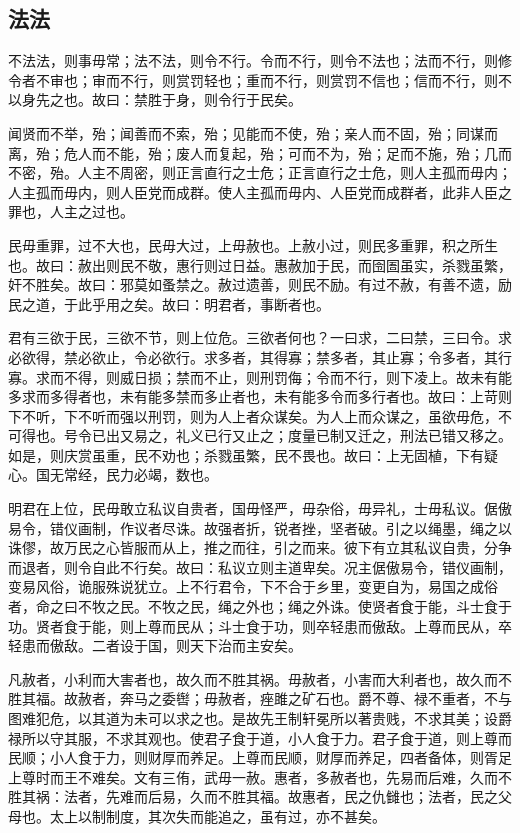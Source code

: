 \documentclass[]{article}
\begin{document}
\hypertarget{header-n282}{%
\subsection{法法}\label{header-n282}}

不法法，则事毋常；法不法，则令不行。令而不行，则令不法也；法而不行，则修令者不审也；审而不行，则赏罚轻也；重而不行，则赏罚不信也；信而不行，则不以身先之也。故曰：禁胜于身，则令行于民矣。

闻贤而不举，殆；闻善而不索，殆；见能而不使，殆；亲人而不固，殆；同谋而离，殆；危人而不能，殆；废人而复起，殆；可而不为，殆；足而不施，殆；几而不密，殆。人主不周密，则正言直行之士危；正言直行之士危，则人主孤而毋内；人主孤而毋内，则人臣党而成群。使人主孤而毋内、人臣党而成群者，此非人臣之罪也，人主之过也。

民毋重罪，过不大也，民毋大过，上毋赦也。上赦小过，则民多重罪，积之所生也。故曰：赦出则民不敬，惠行则过日益。惠赦加于民，而囹圄虽实，杀戮虽繁，奸不胜矣。故曰：邪莫如蚤禁之。赦过遗善，则民不励。有过不赦，有善不遗，励民之道，于此乎用之矣。故曰：明君者，事断者也。

君有三欲于民，三欲不节，则上位危。三欲者何也？一曰求，二曰禁，三曰令。求必欲得，禁必欲止，令必欲行。求多者，其得寡；禁多者，其止寡；令多者，其行寡。求而不得，则威日损；禁而不止，则刑罚侮；令而不行，则下凌上。故未有能多求而多得者也，未有能多禁而多止者也，未有能多令而多行者也。故曰：上苛则下不听，下不听而强以刑罚，则为人上者众谋矣。为人上而众谋之，虽欲毋危，不可得也。号令已出又易之，礼义已行又止之；度量已制又迁之，刑法已错又移之。如是，则庆赏虽重，民不劝也；杀戮虽繁，民不畏也。故曰：上无固植，下有疑心。国无常经，民力必竭，数也。

明君在上位，民毋敢立私议自贵者，国毋怪严，毋杂俗，毋异礼，士毋私议。倨傲易令，错仪画制，作议者尽诛。故强者折，锐者挫，坚者破。引之以绳墨，绳之以诛僇，故万民之心皆服而从上，推之而往，引之而来。彼下有立其私议自贵，分争而退者，则令自此不行矣。故曰：私议立则主道卑矣。况主倨傲易令，错仪画制，变易风俗，诡服殊说犹立。上不行君令，下不合于乡里，变更自为，易国之成俗者，命之曰不牧之民。不牧之民，绳之外也；绳之外诛。使贤者食于能，斗士食于功。贤者食于能，则上尊而民从；斗士食于功，则卒轻患而傲敌。上尊而民从，卒轻患而傲敌。二者设于国，则天下治而主安矣。

凡赦者，小利而大害者也，故久而不胜其祸。毋赦者，小害而大利者也，故久而不胜其福。故赦者，奔马之委辔；毋赦者，痤雎之矿石也。爵不尊、禄不重者，不与图难犯危，以其道为未可以求之也。是故先王制轩冕所以著贵贱，不求其美；设爵禄所以守其服，不求其观也。使君子食于道，小人食于力。君子食于道，则上尊而民顺；小人食于力，则财厚而养足。上尊而民顺，财厚而养足，四者备体，则胥足上尊时而王不难矣。文有三侑，武毋一赦。惠者，多赦者也，先易而后难，久而不胜其祸：法者，先难而后易，久而不胜其福。故惠者，民之仇雠也；法者，民之父母也。太上以制制度，其次失而能追之，虽有过，亦不甚矣。
\end{document}

